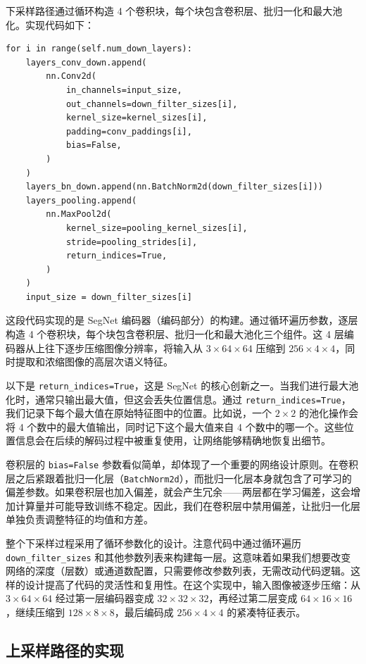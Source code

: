 \documentclass[a4paper]{article}
\begin{document}
下采样路径通过循环构造 4 个卷积块，每个块包含卷积层、批归一化和最大池化。实现代码如下：

\begin{lstlisting}
for i in range(self.num_down_layers):
    layers_conv_down.append(
        nn.Conv2d(
            in_channels=input_size,
            out_channels=down_filter_sizes[i],
            kernel_size=kernel_sizes[i],
            padding=conv_paddings[i],
            bias=False,
        )
    )
    layers_bn_down.append(nn.BatchNorm2d(down_filter_sizes[i]))
    layers_pooling.append(
        nn.MaxPool2d(
            kernel_size=pooling_kernel_sizes[i],
            stride=pooling_strides[i],
            return_indices=True,
        )
    )
    input_size = down_filter_sizes[i]
\end{lstlisting}

这段代码实现的是 SegNet 编码器（编码部分）的构建。通过循环遍历参数，逐层构造 4 个卷积块，每个块包含卷积层、批归一化和最大池化三个组件。这 4 层编码器从上往下逐步压缩图像分辨率，将输入从 $3 \times 64 \times 64$ 压缩到 $256 \times 4 \times 4$，同时提取和浓缩图像的高层次语义特征。

以下是 \texttt{return\_indices=True}，这是 SegNet 的核心创新之一。当我们进行最大池化时，通常只输出最大值，但这会丢失位置信息。通过 \texttt{return\_indices=True}，我们记录下每个最大值在原始特征图中的位置。比如说，一个 $2 \times 2$ 的池化操作会将 4 个数中的最大值输出，同时记下这个最大值来自 4 个数中的哪一个。这些位置信息会在后续的解码过程中被重复使用，让网络能够精确地恢复出细节。

卷积层的 \texttt{bias=False} 参数看似简单，却体现了一个重要的网络设计原则。在卷积层之后紧跟着批归一化层（\texttt{BatchNorm2d}），而批归一化层本身就包含了可学习的偏差参数。如果卷积层也加入偏差，就会产生冗余——两层都在学习偏差，这会增加计算量并可能导致训练不稳定。因此，我们在卷积层中禁用偏差，让批归一化层单独负责调整特征的均值和方差。

整个下采样过程采用了循环参数化的设计。注意代码中通过循环遍历 \texttt{down\_filter\_sizes} 和其他参数列表来构建每一层。这意味着如果我们想要改变网络的深度（层数）或通道数配置，只需要修改参数列表，无需改动代码逻辑。这样的设计提高了代码的灵活性和复用性。在这个实现中，输入图像被逐步压缩：从 $3 \times 64 \times 64$ 经过第一层编码器变成 $32 \times 32 \times 32$，再经过第二层变成 $64 \times 16 \times 16$，继续压缩到 $128 \times 8 \times 8$，最后编码成 $256 \times 4 \times 4$ 的紧凑特征表示。

\subsection{上采样路径的实现}
\end{document}
